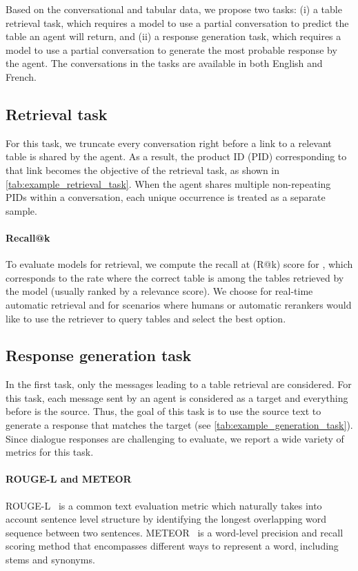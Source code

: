 \documentclass[11pt]{article}
\begin{document}
Based on the conversational and tabular data, we propose two tasks: (i) a table retrieval task, which requires a model to use a partial conversation to predict the table an agent will return, and (ii) a response generation task, which requires a model to use a partial conversation to generate the most probable response by the agent. The conversations in the tasks are available in both English and French. 



\subsection{Retrieval task}
For this task, we truncate every conversation right before a link to a relevant table is shared by the agent. As a result, the product ID (PID) corresponding to that link becomes the objective of the retrieval task, as shown in \autoref{tab:example_retrieval_task}. When the agent shares multiple non-repeating PIDs within a conversation, each unique occurrence is treated as a separate sample.

\paragraph{Recall@k} To evaluate models for retrieval, we compute the recall at  (R@k) score for , which corresponds to the rate where the correct table is among the  tables retrieved by the model (usually ranked by a relevance score). We choose  for real-time automatic retrieval and  for scenarios where humans or automatic rerankers would like to use the retriever to query tables and select the best option.




\subsection{Response generation task}
\label{sec:response_generation_task}
In the first task, only the messages leading to a table retrieval are considered. For this task, each message sent by an agent is considered as a target and everything before is the source. Thus, the goal of this task is to use the source text to generate a response that matches the target (see \autoref{tab:example_generation_task}). Since dialogue responses are challenging to evaluate, we report a wide variety of metrics for this task. 




\paragraph{ROUGE-L and METEOR} ROUGE-L~\cite{lin_rouge_2004, lin_automatic_2004} is a common text evaluation metric which naturally takes into account sentence level structure by identifying the longest overlapping word sequence between two sentences. METEOR~\cite{banerjee_meteor_2005} is a word-level precision and recall scoring method that encompasses different ways to represent a word, including stems and synonyms.
\end{document}
